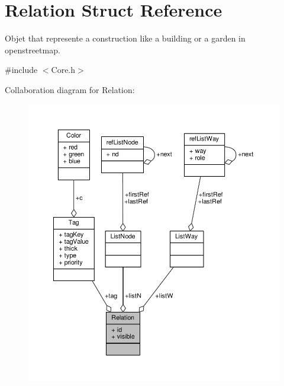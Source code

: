 \hypertarget{structRelation}{\section{Relation Struct Reference}
\label{structRelation}
}


Objet that represente a construction like a building or a garden in openstreetmap.  




{\ttfamily \#include $<$Core.\-h$>$}



Collaboration diagram for Relation\-:
\nopagebreak
\begin{figure}[H]
\begin{center}
\leavevmode
\includegraphics[width=350pt]{structRelation__coll__graph}
\end{center}
\end{figure}
